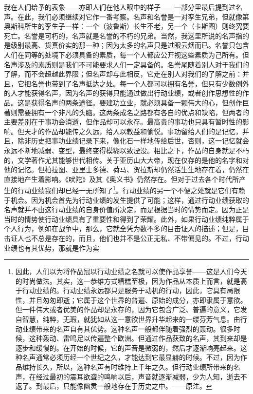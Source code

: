 \documentclass[12pt,oneside]{book}
\begin{document}
我在人们给予的表象——亦即人们在他人眼中的样子——一部分里最后提到过名声。在此，我们必须继续对它作一番考察。名声和名誉是一对孪生兄弟，但就像第奥斯科所生的孪生子一样：一个（波鲁斯）长生不老，另一个（卡斯图）则终究要死亡。名誉是可朽的，名声就是名誉的不朽的兄弟。当然，我这里所说的名声指的是级别最高、货真价实的那一种；因为太多的名声只是过眼云烟而已。名誉只包含人们在同等的处境下必须具备的素质，每一个人都应公开视这些素质为己所有。但名声涉及的素质则是我们不可能要求人们一定具备的。名誉尾随着别人对于我们的了解，而不会超越此界限；但名声却与此相反，它走在别人对我们的了解之前：并且，它把名誉也带到了名声抵达之处。每一个人都可以拥有名誉，但只有少数例外的人才能获得名声，因为名声的获得只能通过做出行动业绩，或者创作思想性的作品。这是获得名声的两条途径。要建功立业，就必须具备一颗伟大的心，但创作巨著则需要拥有一个非凡的头脑。这两条成名之路都有各自的优点和缺陷，但两者的主要差别在于事功会消逝，但作品却可以永存。最高贵的事功也只具有暂时性的影响。但天才的作品却能传之久远，给人以教益和愉悦。事功留给人们的是记忆，并且，除非历史把事功业绩记录下来，像化石一样地传给后世，否则，这一记忆就会永远不断地减弱、变型，最终变得模糊以致湮没。相比之下，作品的自身就是不朽的，文学著作尤其能够世代相传。关于亚历山大大帝，现在仅存的是他的名字和对他的记忆。但柏拉图、亚里士多德、荷马、贺拉斯却仍然活生生地存在着，仍然在直接地产生着影响。《吠陀》及其《奥义书》仍然存在。但对于过去各个时代所产生的行动业绩我们却已经一无所知了\footnote{因此，人们以为将作品冠以行动业绩之名就可以使作品享誉——这是人们今天的时尚做法。其实，这一恭维方式糟糕至极，因为作品从本质上而言，就是高于行动业绩的。行动业绩永远都只是服务于动机的行动，因此，它具有局限性，并且匆匆即逝；它属于这个世界的普遍、原始的成分，亦即隶属于意欲。但一件伟大或者优美的作品却是永存的，因为它包含广泛、普遍的意义，它发自智慧，纯粹，无瑕，就犹如从这一意欲世界升华起来的一缕芬芳气息。由行动业绩带来的名声自有其优势。这种名声一般都伴随着强烈的轰动。很多时候，这种轰动、雷鸣足以传遍整个欧洲。但通过作品获致的名声，其到来却是逐步和缓慢的。在开始的时候，它的声音是微弱的，然后才逐渐响亮起来。这种名声通常必须历经一个世纪之久，才能达到它最显赫的时候。不过，因为作品维持长久，所以，这种名声有时维持上千年之久。但行动业绩所带来的名声，在经过最初的震耳欲聋的鸣响以后，声音就逐渐减弱，少为人知，逝去不返了。到最后，只能像幽灵一般地存在于历史之中。——原注。}。行动业绩的另一个不便之处就是它们有赖于机会。因为机会首先为行动业绩的发生提供了可能；这样，通过行动业绩获取的名声就并不由这行动业绩的自身价值所决定，而是根据当时的情势而定。因为正是当时的情势使行动业绩具有了重要性和得到了荣耀。此外，如果行动业绩纯粹属于个人行为，例如在战争中，那么，它就全凭为数不多的目击证人的描述；但是，目击证人也不总是存在的，而且，他们也并不是公正无私、不带偏见的。不过，行动业绩也有其优势，那就是作为实
\end{document}
